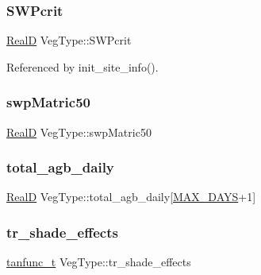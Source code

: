 \subsubsection{\texorpdfstring{S\+W\+Pcrit}{SWPcrit}}
{\footnotesize\ttfamily \hyperlink{generic_8h_af1c105fd5732f70b91ddaeda0cc340e3}{RealD} Veg\+Type\+::\+S\+W\+Pcrit}



Referenced by init\+\_\+site\+\_\+info().

\mbox{\label{struct_veg_type_a2d8ff7ce9d54b9b2e83757ed5ca6ab1f}} 
\subsubsection{\texorpdfstring{swp\+Matric50}{swpMatric50}}
{\footnotesize\ttfamily \hyperlink{generic_8h_af1c105fd5732f70b91ddaeda0cc340e3}{RealD} Veg\+Type\+::swp\+Matric50}

\mbox{\label{struct_veg_type_a3536780e65f7db9527448c4ee08908b4}} 
\subsubsection{\texorpdfstring{total\+\_\+agb\+\_\+daily}{total\_agb\_daily}}
{\footnotesize\ttfamily \hyperlink{generic_8h_af1c105fd5732f70b91ddaeda0cc340e3}{RealD} Veg\+Type\+::total\+\_\+agb\+\_\+daily\mbox{[}\hyperlink{_times_8h_a01f08d46080872b9f4284873b7f9dee4}{M\+A\+X\+\_\+\+D\+A\+YS}+1\mbox{]}}

\mbox{\label{struct_veg_type_af3afdd2c85788d6b6a4c1d91c0d3e483}} 
\subsubsection{\texorpdfstring{tr\+\_\+shade\+\_\+effects}{tr\_shade\_effects}}
{\footnotesize\ttfamily \hyperlink{structtanfunc__t}{tanfunc\+\_\+t} Veg\+Type\+::tr\+\_\+shade\+\_\+effects}

